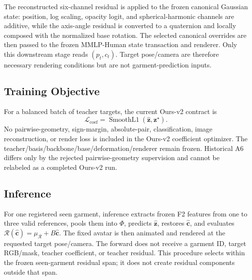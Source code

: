 The reconstructed six-channel residual is applied to the frozen canonical Gaussian state: position, log scaling, opacity logit, and spherical-harmonic channels are additive, while the axis-angle residual is converted to a quaternion and locally composed with the normalized base rotation. The selected canonical overrides are then passed to the frozen MMLP-Human state transaction and renderer. Only this downstream stage reads $(p_t,c_t)$. Target pose/camera are therefore necessary rendering conditions but are not garment-prediction inputs.

\subsection{Training Objective}

For a balanced batch of teacher targets, the current Ours-v2 contract is
\begin{equation}
\mathcal L_{\mathrm{coef}}=
\operatorname{SmoothL1}(\hat{\mathbf z},\mathbf z^{\star}).
\end{equation}
No pairwise-geometry, sign-margin, absolute-pair, classification, image reconstruction, or render loss is included in the Ours-v2 coefficient optimizer. The teacher/basis/backbone/base/deformation/renderer remain frozen.  Historical A6 differs only by the rejected pairwise-geometry supervision and cannot be relabeled as a completed Ours-v2 run.

\subsection{Inference}

For one registered seen garment, inference extracts frozen F2 features from one to three valid references, pools them into $\Phi$, predicts $\hat{\mathbf z}$, restores $\hat{\mathbf c}$, and evaluates $\mathcal R(\hat{\mathbf c})=\mu_{\mathcal R}+B\hat{\mathbf c}$. The fixed avatar is then animated and rendered at the requested target pose/camera. The forward does not receive a garment ID, target RGB/mask, teacher coefficient, or teacher residual. This procedure selects within the frozen seen-garment residual span; it does not create residual components outside that span.
